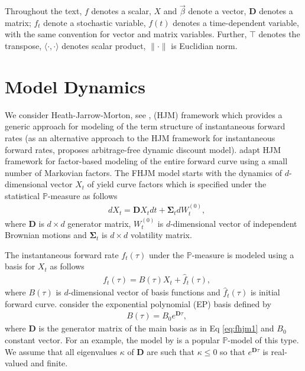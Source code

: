 \documentclass[pdftex,11pt,a4paper] {article}
\begin{document}
Throughout the text, $f$ denotes a scalar, $X$ and $\vec{\beta}$ denote a vector, $\mathbf{D}$ denotes a matrix; $f_{t}$ denote a stochastic variable, $f(t)$ denotes a time-dependent variable, with the same convention for vector and matrix variables. Further, $\top$ denotes the transpose, $\langle\cdot,\cdot\rangle$ denotes scalar product, $\|\cdot \|$ is Euclidian norm.



\section{Model Dynamics}\label{sec::model_dynamics}


We consider Heath-Jarrow-Morton, see \cite{HJM1992}, (HJM) framework which provides a generic approach for modeling of the term structure of instantaneous forward rates (as an alternative approach to the HJM framework for instantaneous forward rates, \cite{Filipovic2023} proposes arbitrage-free dynamic discount model). 
\cite{Lyashenko2023} adapt HJM framework for factor-based modeling of the entire forward curve using a small number of Markovian factors. The FHJM model starts with the dynamics of $d$-dimensional vector $X_{t}$ of yield curve factors which is specified under the statistical $\mathbb{P}$-measure as follows
\begin{equation}\label{eq:fhjm1}
\begin{split}
&   dX_{t} = \mathbf{D} X_{t}dt  + \mathbf{\Sigma}_{t}dW^{(0)}_{t},
\end{split}
\end{equation}
where $\mathbf{D}$ is $d\times d$ generator matrix, $W^{(0)}_{t}$ is $d$-dimensional vector of independent Brownian motions and $\mathbf{\Sigma}_{t}$ is $d\times d$ volatility matrix.



The instantaneous forward rate $f_{t}(\tau)$ under the $\mathbb{P}$-measure is modeled using a basis for $X_{t}$ as follows
\begin{equation}\label{eq:fhjm2}
\begin{split}
&   f_{t}(\tau) = B(\tau) X_{t} + \hat{f}_{t}(\tau),
\end{split}
\end{equation}
where $B(\tau)$ is $d$-dimensional vector of basis functions and $\hat{f}_{t}(\tau)$ is initial forward curve. \cite{Lyashenko2023} consider the exponential polynomial (EP) basis defined by
\begin{equation}\label{eq:fhjm3}
\begin{split}
&   B(\tau)=B_0e^{\mathbf{D}\tau},
\end{split}
\end{equation}
where $\mathbf{D}$ is the generator matrix of the main basis as in Eq \eqref{eq:fhjm1} and $B_0$ constant vector. For an example, the model by \cite{NS1987} is a popular $\mathbb{P}$-model of this type. We assume that all eigenvalues $\kappa$ of $\mathbf{D}$ are such that $\kappa \leq 0$ so that $e^{\mathbf{D}\tau}$ is real-valued and finite.
\end{document}
